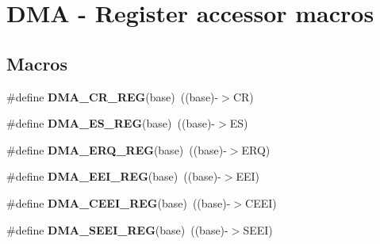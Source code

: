\hypertarget{group__DMA__Register__Accessor__Macros}{}\section{D\+MA -\/ Register accessor macros}
\label{group__DMA__Register__Accessor__Macros}
\subsection*{Macros}
\begin{DoxyCompactItemize}
\item 
\#define {\bfseries D\+M\+A\+\_\+\+C\+R\+\_\+\+R\+EG}(base)~((base)-\/$>$CR)\hypertarget{group__DMA__Register__Accessor__Macros_gab39b8948b1c8f2a4800b7ef5bb28f81e}{}\label{group__DMA__Register__Accessor__Macros_gab39b8948b1c8f2a4800b7ef5bb28f81e}

\item 
\#define {\bfseries D\+M\+A\+\_\+\+E\+S\+\_\+\+R\+EG}(base)~((base)-\/$>$ES)\hypertarget{group__DMA__Register__Accessor__Macros_ga8b2c269003e3359dc2bcfc7a4ba22d76}{}\label{group__DMA__Register__Accessor__Macros_ga8b2c269003e3359dc2bcfc7a4ba22d76}

\item 
\#define {\bfseries D\+M\+A\+\_\+\+E\+R\+Q\+\_\+\+R\+EG}(base)~((base)-\/$>$E\+RQ)\hypertarget{group__DMA__Register__Accessor__Macros_ga764faa6d381a740294254d9804cf1f0a}{}\label{group__DMA__Register__Accessor__Macros_ga764faa6d381a740294254d9804cf1f0a}

\item 
\#define {\bfseries D\+M\+A\+\_\+\+E\+E\+I\+\_\+\+R\+EG}(base)~((base)-\/$>$E\+EI)\hypertarget{group__DMA__Register__Accessor__Macros_ga155bdfb51279d49a987de39ea701ced9}{}\label{group__DMA__Register__Accessor__Macros_ga155bdfb51279d49a987de39ea701ced9}

\item 
\#define {\bfseries D\+M\+A\+\_\+\+C\+E\+E\+I\+\_\+\+R\+EG}(base)~((base)-\/$>$C\+E\+EI)\hypertarget{group__DMA__Register__Accessor__Macros_ga86e8546f3029a90bf8302c18d99c81b2}{}\label{group__DMA__Register__Accessor__Macros_ga86e8546f3029a90bf8302c18d99c81b2}

\item 
\#define {\bfseries D\+M\+A\+\_\+\+S\+E\+E\+I\+\_\+\+R\+EG}(base)~((base)-\/$>$S\+E\+EI)\hypertarget{group__DMA__Register__Accessor__Macros_gab6ae65cbaf7542019478d2dac850c80f}{}\label{group__DMA__Register__Accessor__Macros_gab6ae65cbaf7542019478d2dac850c80f}


\end{DoxyCompactItemize}
